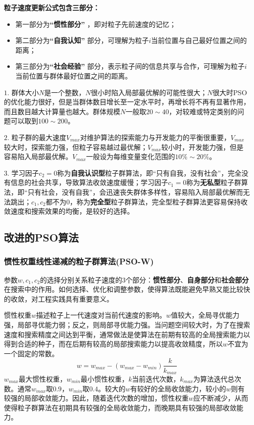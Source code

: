\documentclass[UTF8]{ctexart}
\begin{document}
\noindent \textbf{粒子速度更新公式包含三部分：}
\begin{itemize}
    \item 第一部分为\textbf{“惯性部分”} ，即对粒子先前速度的记忆；
    \item 第二部分为\textbf{“自我认知”} 部分，可理解为粒子$i$当前位置与自己最好位置之间的距离；
    \item 第三部分为\textbf{“社会经验”} 部分，表示粒子间的信息共享与合作，可理解为粒子$i$当前位置与群体最好位置之间的距离。   
\end{itemize}

$1$. 群体大小$N$是一个整数，$N$很小时陷入局部最优解的可能性很大；$N$很大时PSO的优化能力很好，但是当群体数目增长至一定水平时，再增长将不再有显著作用，而且数目越大计算量也越大。群体规模$N$一般取$20 \sim 40$，对较难或特定类别的问题可以取到$100 \sim 200$。

$2$. 粒子群的最大速度$V_{max}$对维护算法的探索能力与开发能力的平衡很重要，$V_{max}$较大时，探索能力强，但粒子容易越过最优解；$V_{max}$较小时，开发能力强，但是容易陷入局部最优解。$V_{max}$一般设为每维变量变化范围的$10\% \sim 20\%$。
  
$3$. 学习因子$c_2=0$称为\textbf{自我认识型}粒子群算法，即“只有自我，没有社会”，完全没有信息的社会共享，导致算法收敛速度缓慢；学习因子$c_1=0$称为\textbf{无私型}粒子群算法，即“只有社会，没有自我”，会迅速丧失群体多样性，容易陷入局部最优解而无法跳出；$c_1,c_2$都不为$0$，称为\textbf{完全型}粒子群算法，完全型粒子群算法更容易保持收敛速度和搜索效果的均衡，是较好的选择。

\subsection{改进的PSO算法}
\subsubsection{惯性权重线性递减的粒子群算法(PSO-W)}
参数$w,c_1,c_2$的选择分别关系粒子速度的$3$个部分：\textbf{惯性部分}、\textbf{自身部分}和\textbf{社会部分}在搜索中的作用。如何选择、优化和调整参数，使得算法既能避免早熟又能比较快的收敛，对工程实践具有重要意义。

惯性权重$w$描述粒子上一代速度对当前代速度的影响。$w$值较大，全局寻优能力强，局部寻优能力弱；反之，则局部寻优能力强。当问题空间较大时，为了在搜索速度和搜索精度之间达到平衡，通常做法是使算法在前期有较高的全局搜索能力以得到合适的种子，而在后期有较高的局部搜索能力以提高收敛精度，所以$w$不宜为一个固定的常数。
$$w=w_{max}-\left(w_{max}-w_{min}\right)\frac{k}{k_{max}}$$
$w_{max}$最大惯性权重，$w_{min}$最小惯性权重，$k$当前迭代次数，$k_{max}$为算法迭代总次数。通常$w_{max}$取$0.9$，$w_{min}$取$0.4$。较大的$w$有较好的全局收敛能力，较小的$w$则有较强的局部收敛能力。因此，随着迭代次数的增加，惯性权重$w$应不断减少，从而使得粒子群算法在初期具有较强的全局收敛能力，而晚期具有较强的局部收敛能力。
\end{document}
